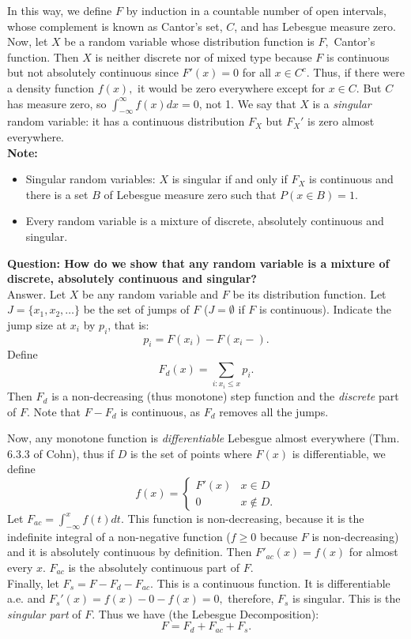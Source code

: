 \documentclass[12pt]{report} \addtolength{\textheight}{2in}
\newcommand{\totalint}{\int_{-\infty}^{\infty}}
\begin{document}
In this way, we define $F$ by induction in a countable number of open intervals, whose complement is known as Cantor's set, $C$, and has Lebesgue measure zero. Now, let $X$ be a random variable whose distribution function is $F,$ Cantor's function. Then $X$ is neither discrete nor of mixed type because $F$ is continuous but not absolutely continuous since $F'(x)=0$ for all $ x \in C^c.$ Thus, if there were a density function $f(x),$ it would be zero everywhere except for $x \in C$. But $C$ has measure zero, so $\totalint f(x)dx =0$, not 1. We say that $X$ is a \textit{singular} random variable: it has a continuous distribution $F_X$ but $F_X'$ is zero almost everywhere.\\

\textbf{Note:}
\begin{itemize}
\item Singular random variables: $X$ is singular if and only if $F_X$ is continuous and there is a set $B$ of Lebesgue measure zero such that $P(x\in B)=1.$
\item Every random variable is a mixture of discrete, absolutely continuous and singular.
\end{itemize}
\textbf{Question: How do we show that any random variable is a mixture of discrete, absolutely continuous and singular?}\\
Answer. Let $X$ be any random variable and $F$ be its distribution function. Let $J=\{x_1,x_2,\dots\}$ be the set of jumps of $F$ ($J=\emptyset$ if $F$ is continuous). Indicate the jump size at $x_i$ by $p_i$, that is:
\begin{displaymath}
p_i=F(x_i)-F(x_i-).
\end{displaymath}
Define
\begin{displaymath}
F_d(x)=\sum_{i: x_i \leq x} p_i.
\end{displaymath}
Then $F_d$ is a non-decreasing (thus monotone) step function and the \textit{discrete} part of $F$. Note that $F-F_d$ is continuous, as $F_d$ removes all the jumps.

Now, any monotone function is \textit{differentiable} Lebesgue almost everywhere (Thm. 6.3.3 of Cohn), thus if $D$ is the set of points where $F(x)$ is differentiable, we define
\begin{displaymath}
f(x)=
\begin{cases}
F'(x) & x\in D\\
0& x\not\in D.
\end{cases}
\end{displaymath}
Let $F_{ac}=\int_{-\infty}^{x} f(t)dt.$ This function is non-decreasing, because it is the indefinite integral of a non-negative function ($f \geq 0$ because $F$ is non-decreasing) and it is absolutely continuous by definition. Then $F'_{ac}(x)=f(x)$ for almost every $x$. $F_{ac}$ is the absolutely continuous part of $F$.\\
Finally, let $F_s=F-F_{d}-F_{ac}.$ This is a continuous function. It is differentiable a.e. and $F_{s}'(x)=f(x)-0-f(x)=0,$ therefore, $F_s$ is singular. This is the \textit{singular part} of $F$. Thus we have (the Lebesgue Decomposition):
\begin{displaymath}
F=F_{d}+F_{ac}+F_{s}.
\end{displaymath}
\end{document}
